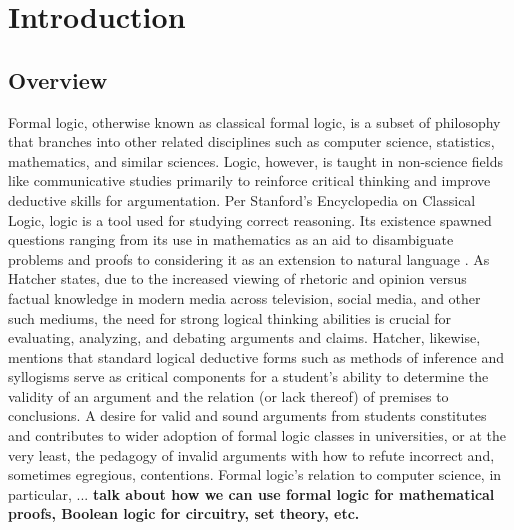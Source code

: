 \documentclass[ms]{uncgdissertationexp2}
\theoremstyle{plain}
\theoremstyle{definition}
\theoremstyle{remark}
\begin{document}
\tableofcontents 





\mainmatter %
\chapter{Introduction}
    \section{Overview}
    Formal logic, otherwise known as classical formal logic, is a subset of philosophy that branches into other related disciplines such as computer science, statistics, mathematics, and similar sciences. Logic, however, is taught in non-science fields like communicative studies primarily to reinforce critical thinking and improve deductive skills for argumentation. Per Stanford's Encyclopedia on Classical Logic, logic is a tool used for studying correct reasoning. Its existence spawned questions ranging from its use in mathematics as an aid to disambiguate problems and proofs to considering it as an extension to natural language \cite{stanfordencyclopedia}. As Hatcher \cite{hatcher} states, due to the increased viewing of rhetoric and opinion versus factual knowledge in modern media across television, social media, and other such mediums, the need for strong logical thinking abilities is crucial for evaluating, analyzing, and debating arguments and claims. Hatcher, likewise, mentions that standard logical deductive forms such as methods of inference and syllogisms serve as critical components for a student's ability to determine the validity of an argument and the relation (or lack thereof) of premises to conclusions. A desire for valid and sound arguments from students constitutes and contributes to wider adoption of formal logic classes in universities, or at the very least, the pedagogy of invalid arguments with how to refute incorrect and, sometimes egregious, contentions.  Formal logic's relation to computer science, in particular, ... \textbf{talk about how we can use formal logic for mathematical proofs, Boolean logic for circuitry, set theory, etc.}
\end{document}
